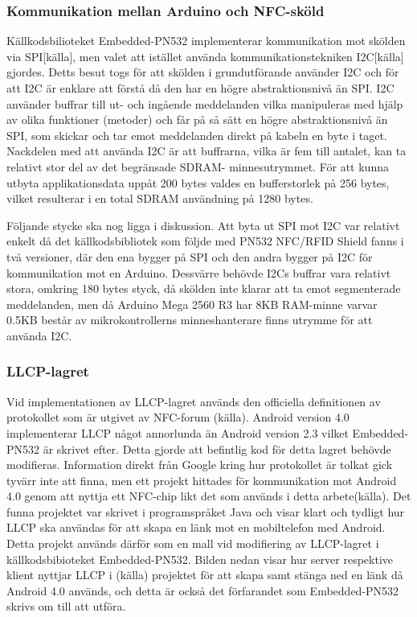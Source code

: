 \documentclass[11pt]{article}
\begin{document}
\subsubsection{Kommunikation mellan Arduino och NFC-sköld}
Källkodsbilioteket Embedded-PN532 implementerar kommunikation mot skölden via SPI[källa], men valet att istället använda kommunikationstekniken I2C[källa] gjordes. Detts besut togs för att skölden i grundutförande använder I2C och för att I2C är enklare att förstå då den har en högre abstraktionsnivå än SPI. I2C använder buffrar till ut- och ingående meddelanden vilka manipuleras med hjälp av olika funktioner (metoder) och får på så sätt en högre abstraktionsnivå än SPI, som skickar och tar emot meddelanden direkt på kabeln en byte i taget. Nackdelen med att använda I2C är att buffrarna, vilka är fem till antalet, kan ta relativt stor del av det begränsade SDRAM- minnesutrymmet. För att kunna utbyta applikationsdata uppåt 200 bytes valdes en bufferstorlek på 256 bytes, vilket resulterar i en total SDRAM användning på 1280 bytes.

Följande stycke ska nog ligga i diskussion.
Att byta ut SPI mot I2C var relativt enkelt då det källkodsbibliotek som följde med PN532 NFC/RFID Shield fanns i två versioner, där den ena bygger på SPI och den andra bygger på I2C för kommunikation mot en Arduino. Dessvärre behövde I2Cs buffrar vara relativt stora, omkring 180 bytes styck, då skölden inte klarar att ta emot segmenterade meddelanden, men då Arduino Mega 2560 R3 har 8KB RAM-minne varvar 0.5KB består av mikrokontrollerns minneshanterare finns utrymme för att använda I2C.  

\subsubsection{LLCP-lagret}
Vid implementationen av LLCP-lagret används den officiella definitionen av protokollet som är utgivet av NFC-forum (källa). Android version 4.0 implementerar LLCP något annorlunda än Android version 2.3 vilket Embedded-PN532 är skrivet efter. Detta gjorde att befintlig kod för detta lagret behövde modifieras. Information direkt från Google kring hur protokollet är tolkat gick tyvärr inte att finna, men ett projekt hittades för kommunikation mot Android 4.0 genom att nyttja ett NFC-chip likt det som används i detta arbete(källa).  Det funna projektet var skrivet i programspråket Java och visar klart och tydligt hur LLCP ska användas för att skapa en länk mot en mobiltelefon med Android. Detta projekt används därför som en mall vid modifiering av LLCP-lagret i källkodsbibioteket Embedded-PN532. Bilden nedan visar hur server respektive klient nyttjar LLCP i (källa) projektet för att skapa samt stänga ned en länk då Android 4.0 används, och detta är också det förfarandet som Embedded-PN532 skrivs om till att utföra.
\end{document}
